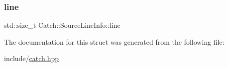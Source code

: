 \mbox{\label{struct_catch_1_1_source_line_info_a841e5d696c7b9cde24e45e61dd979c77}} 
\subsubsection{\texorpdfstring{line}{line}}
{\footnotesize\ttfamily std\+::size\+\_\+t Catch\+::\+Source\+Line\+Info\+::line}



The documentation for this struct was generated from the following file\+:\begin{DoxyCompactItemize}
\item 
include/\mbox{\hyperlink{catch_8hpp}{catch.\+hpp}}\end{DoxyCompactItemize}

